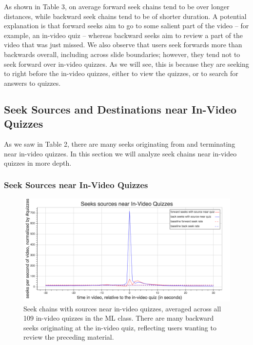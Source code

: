 \documentclass{sigchi}
\begin{document}
As shown in Table 3, on average forward seek chains tend to be over longer distances, while backward seek chains tend to be of shorter duration. A potential explanation is that forward seeks aim to go to some salient part of the video -- for example, an in-video quiz -- whereas backward seeks aim to review a part of the video that was just missed. We also observe that users seek forwards more than backwards overall, including across slide boundaries; however, they tend not to seek forward over in-video quizzes. As we will see, this is because they are seeking to right before the in-video quizzes, either to view the quizzes, or to search for answers to quizzes. %

\subsection{Seek Sources and Destinations near In-Video Quizzes}


As we saw in Table 2, there are many seeks originating from and terminating near in-video quizzes. In this section we will analyze seek chains near in-video quizzes in more depth. %

\subsubsection{Seek Sources near In-Video Quizzes}

\begin{figure}
\includegraphics[width=1.0\columnwidth]{seek-sources-near-quizzes}
\caption{Seek chains with sources near in-video quizzes, averaged across all 109 in-video quizzes in the ML class. There are many backward seeks originating at the in-video quiz, reflecting users wanting to review the preceding material.}
\label{fig:seek-sources-near-quizzes}
\end{figure}
\end{document}
